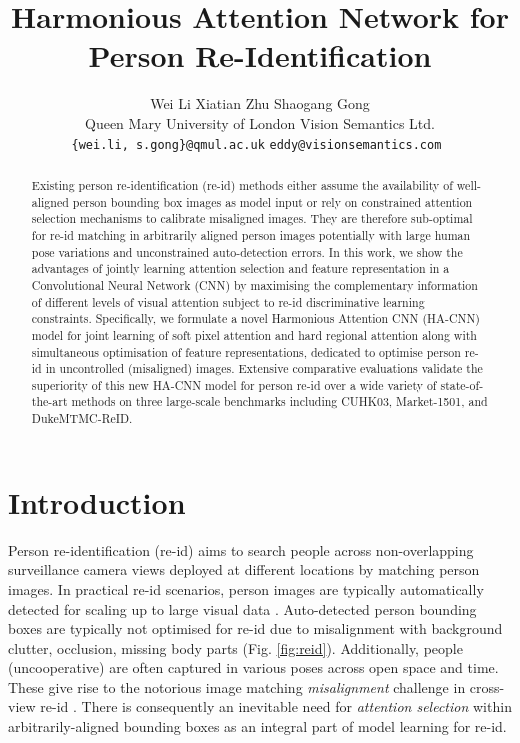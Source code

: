 \documentclass[10pt,twocolumn,letterpaper]{article}
\begin{document}
\title{Harmonious Attention Network for Person Re-Identification}
\author{Wei Li 
	\quad \quad  \quad \quad  \quad Xiatian Zhu 
	 \quad \quad \quad \quad \quad  Shaogang Gong \\
Queen Mary University of London \quad \quad \quad \quad Vision Semantics Ltd.\\
{\tt\small \{wei.li, s.gong\}@qmul.ac.uk} 
\quad \quad 
\tt\small eddy@visionsemantics.com
}

\maketitle




\begin{abstract}
	
Existing person re-identification (re-id) methods 
either assume the availability of well-aligned person bounding box images as model input
or rely on constrained attention selection mechanisms to calibrate misaligned images.
They are therefore sub-optimal for re-id matching in arbitrarily
aligned person images potentially with large human pose variations and 
unconstrained auto-detection errors.
In this work, we show the
advantages of jointly learning attention selection and feature representation
in a Convolutional Neural Network (CNN) by 
maximising the complementary information of different levels of visual
attention subject
to re-id discriminative learning constraints. 
Specifically, we
formulate a novel Harmonious Attention CNN (HA-CNN) model for 
joint learning of soft pixel attention and hard regional attention
along with simultaneous optimisation of feature representations, 
dedicated to optimise person re-id in uncontrolled (misaligned) images.
Extensive comparative evaluations validate the superiority of this new
HA-CNN model for person re-id over a wide variety of
state-of-the-art methods on three large-scale benchmarks
including CUHK03, Market-1501, and DukeMTMC-ReID. 	

\end{abstract}

\section{Introduction}
Person re-identification (re-id) aims to search people across non-overlapping surveillance camera views deployed at different locations by matching person images.
In practical re-id scenarios, 
person images are typically automatically detected for scaling up to
large visual data \cite{zheng2015scalable,li2014deepreid}.
Auto-detected person bounding boxes are typically not optimised for re-id 
due to misalignment with background clutter, occlusion, missing body parts
(Fig. \ref{fig:reid}). 
Additionally, people ({uncooperative)} are often captured in various poses across open space and time.
These give rise to the notorious image matching {\em misalignment} challenge
in cross-view re-id \cite{gong2014person}.
There is consequently an inevitable need for {\em attention selection} 
within arbitrarily-aligned bounding boxes 
as an integral part of model learning for re-id.
\end{document}
